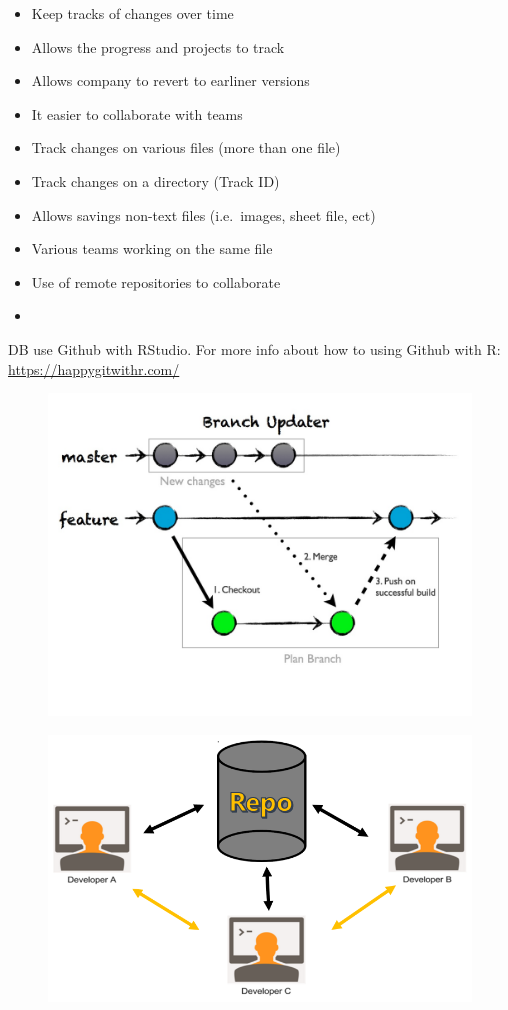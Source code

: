 \documentclass[]{book}
\begin{document}
\begin{itemize}
\item
  Keep tracks of changes over time
\item
  Allows the progress and projects to track
\item
  Allows company to revert to earliner versions
\item
  It easier to collaborate with teams
\item
  Track changes on various files (more than one file)
\item
  Track changes on a directory (Track ID)
\item
  Allows savings non-text files (i.e.~images, sheet file, ect)
\item
  Various teams working on the same file
\item
  Use of remote repositories to collaborate
\item
\end{itemize}

DB use Github with RStudio. For more info about how to using Github with
R: \url{https://happygitwithr.com/}

\begin{figure}
\centering
\includegraphics{github1.png}
\caption{}
\end{figure}

\begin{figure}
\centering
\includegraphics{github2.png}
\caption{}
\end{figure}
\end{document}
